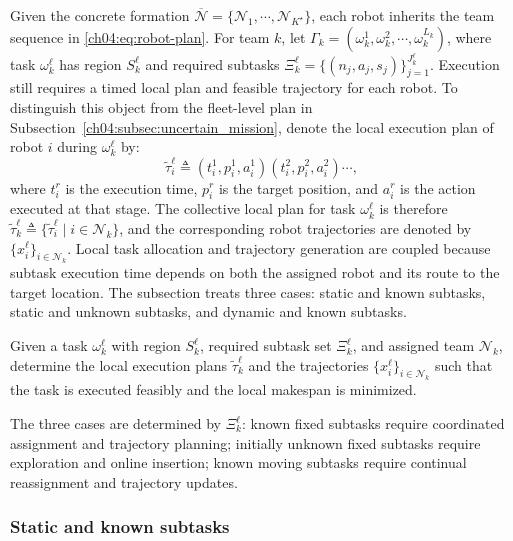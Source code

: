 Given the concrete formation
$\overline{\mathcal{N}}=\{\mathcal{N}_1,\cdots,\mathcal{N}_{K^\star}\}$, each
robot inherits the team sequence in \eqref{ch04:eq:robot-plan}. For team
$k$, let $\Gamma_k=(\omega_k^1,\omega_k^2,\cdots,\omega_k^{L_k})$, where task
$\omega_k^\ell$ has region $S_k^\ell$ and required subtasks
$\Xi_k^\ell=\{(n_j,a_j,s_j)\}_{j=1}^{J_k^\ell}$. Execution still requires a
timed local plan and feasible trajectory for each robot. To distinguish this
object from the fleet-level plan in Subsection~\ref{ch04:subsec:uncertain_mission}, denote the
local execution plan of robot $i$ during $\omega_k^\ell$ by:
\[
\widetilde{\tau}_i^\ell \triangleq
(t_i^1,p_i^1,a_i^1)(t_i^2,p_i^2,a_i^2)\cdots,
\]
where $t_i^r$ is the execution time, $p_i^r$ is the target position, and
$a_i^r$ is the action executed at that stage. The collective local plan for
task $\omega_k^\ell$ is therefore
$\widetilde{\tau}_k^\ell \triangleq
\{\widetilde{\tau}_i^\ell \mid i\in\mathcal{N}_k\}$, and the corresponding
robot trajectories are denoted by $\{x_i^\ell\}_{i\in\mathcal{N}_k}$.
Local task allocation and trajectory generation are coupled because subtask
execution time depends on both the assigned robot and its route to the target
location. The subsection treats three cases: static and known subtasks, static
and unknown subtasks, and dynamic and known subtasks.

\begin{problem}
\label{ch04:prob:local_coordination}
Given a task $\omega_k^\ell$ with region $S_k^\ell$, required subtask set
$\Xi_k^\ell$, and assigned team $\mathcal{N}_k$, determine the local execution
plans $\widetilde{\tau}_k^\ell$ and the trajectories
$\{x_i^\ell\}_{i\in\mathcal{N}_k}$ such that the task is executed feasibly and
the local makespan is minimized.
\end{problem}

The three cases are determined by $\Xi_k^\ell$: known fixed subtasks require
coordinated assignment and trajectory planning; initially unknown fixed subtasks
require exploration and online insertion; known moving subtasks require continual
reassignment and trajectory updates.

\subsubsection{Static and known subtasks}
\label{ch04:sec:static-known}

